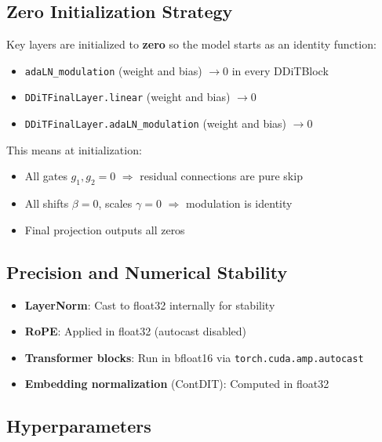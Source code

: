 \documentclass[11pt,a4paper]{article}
\begin{document}
\subsection{Zero Initialization Strategy}

Key layers are initialized to \textbf{zero} so the model starts as an identity function:
\begin{itemize}
    \item \texttt{adaLN\_modulation} (weight and bias) $\to 0$ in every DDiTBlock
    \item \texttt{DDiTFinalLayer.linear} (weight and bias) $\to 0$
    \item \texttt{DDiTFinalLayer.adaLN\_modulation} (weight and bias) $\to 0$
\end{itemize}
This means at initialization:
\begin{itemize}
    \item All gates $g_1, g_2 = 0$ $\Rightarrow$ residual connections are pure skip
    \item All shifts $\beta = 0$, scales $\gamma = 0$ $\Rightarrow$ modulation is identity
    \item Final projection outputs all zeros
\end{itemize}

\subsection{Precision and Numerical Stability}

\begin{itemize}
    \item \textbf{LayerNorm}: Cast to float32 internally for stability
    \item \textbf{RoPE}: Applied in float32 (autocast disabled)
    \item \textbf{Transformer blocks}: Run in bfloat16 via \texttt{torch.cuda.amp.autocast}
    \item \textbf{Embedding normalization} (ContDIT): Computed in float32
\end{itemize}

\subsection{Hyperparameters}
\end{document}
